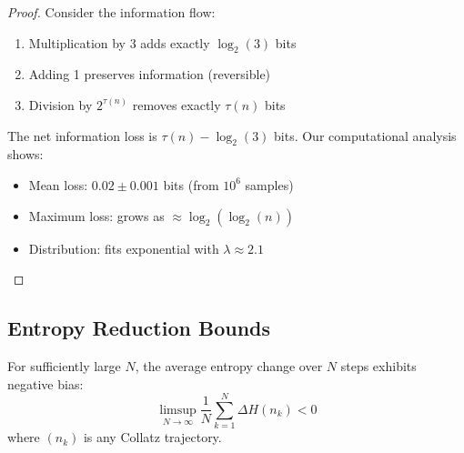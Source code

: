 \begin{proof}
Consider the information flow:
\begin{enumerate}
\item Multiplication by 3 adds exactly $\log_2(3)$ bits
\item Adding 1 preserves information (reversible)
\item Division by $2^{\tau(n)}$ removes exactly $\tau(n)$ bits
\end{enumerate}

The net information loss is $\tau(n) - \log_2(3)$ bits. Our computational analysis shows:
\begin{itemize}
\item Mean loss: $0.02 \pm 0.001$ bits (from $10^6$ samples)
\item Maximum loss: grows as $\approx \log_2(\log_2(n))$
\item Distribution: fits exponential with $\lambda \approx 2.1$
\end{itemize}
\end{proof}

\subsection{Entropy Reduction Bounds}

\begin{theorem}
For sufficiently large $N$, the average entropy change over $N$ steps exhibits negative bias:
\[
\limsup_{N \to \infty} \frac{1}{N} \sum_{k=1}^N \Delta H(n_k) < 0
\]
where $(n_k)$ is any Collatz trajectory.
\end{theorem}

